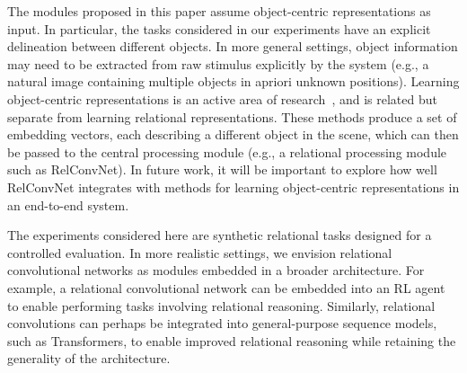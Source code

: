 The modules proposed in this paper assume object-centric representations as input. In particular, the tasks considered in our experiments have an explicit delineation between different objects. In more general settings, object information may need to be extracted from raw stimulus explicitly by the system (e.g., a natural image containing multiple objects in apriori unknown positions). Learning object-centric representations is an active area of research~\citep{sabour2017dynamic,greff2019multiobject,locatelloObjectCentricLearningSlot2020,kipf2022conditional}, and is related but separate from learning relational representations. These methods produce a set of embedding vectors, each describing a different object in the scene, which can then be passed to the central processing module (e.g., a relational processing module such as RelConvNet). In future work, it will be important to explore how well RelConvNet integrates with methods for learning object-centric representations in an end-to-end system.

The experiments considered here are synthetic relational tasks designed for a controlled evaluation. In more realistic settings, we envision relational convolutional networks as modules embedded in a broader architecture. For example, a relational convolutional network can be embedded into an RL agent to enable performing tasks involving relational reasoning. Similarly, relational convolutions can perhaps be integrated into general-purpose sequence models, such as Transformers, to enable improved relational reasoning while retaining the generality of the architecture.